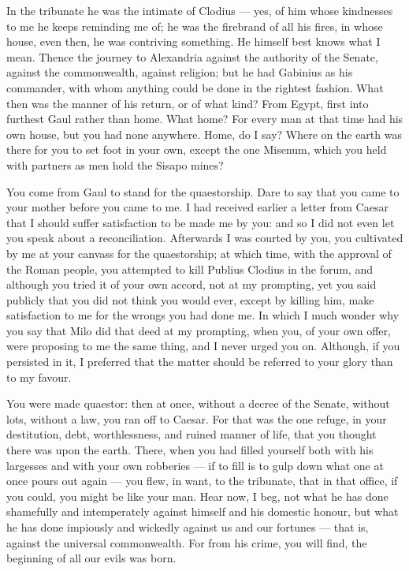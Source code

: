  In the tribunate he was the intimate of Clodius --- yes, of him whose kindnesses to me he keeps reminding me of; he was the firebrand of all his fires, in whose house, even then, he was contriving something. He himself best knows what I mean. Thence the journey to Alexandria against the authority of the Senate, against the commonwealth, against religion; but he had Gabinius as his commander, with whom anything could be done in the rightest fashion. What then was the manner of his return, or of what kind? From Egypt, first into furthest Gaul rather than home. What home? For every man at that time had his own house, but you had none anywhere. Home, do I say? Where on the earth was there for you to set foot in your own, except the one Misenum, which you held with partners as men hold the Sisapo mines?

 You come from Gaul to stand for the quaestorship. Dare to say that you came to your mother before you came to me. I had received earlier a letter from Caesar that I should suffer satisfaction to be made me by you: and so I did not even let you speak about a reconciliation. Afterwards I was courted by you, you cultivated by me at your canvass for the quaestorship; at which time, with the approval of the Roman people, you attempted to kill Publius Clodius in the forum, and although you tried it of your own accord, not at my prompting, yet you said publicly that you did not think you would ever, except by killing him, make satisfaction to me for the wrongs you had done me. In which I much wonder why you say that Milo did that deed at my prompting, when you, of your own offer, were proposing to me the same thing, and I never urged you on. Although, if you persisted in it, I preferred that the matter should be referred to your glory than to my favour.

 You were made quaestor: then at once, without a decree of the Senate, without lots, without a law, you ran off to Caesar. For that was the one refuge, in your destitution, debt, worthlessness, and ruined manner of life, that you thought there was upon the earth. There, when you had filled yourself both with his largesses and with your own robberies --- if to fill is to gulp down what one at once pours out again --- you flew, in want, to the tribunate, that in that office, if you could, you might be like your man. Hear now, I beg, not what he has done shamefully and intemperately against himself and his domestic honour, but what he has done impiously and wickedly against us and our fortunes --- that is, against the universal commonwealth. For from his crime, you will find, the beginning of all our evils was born.

